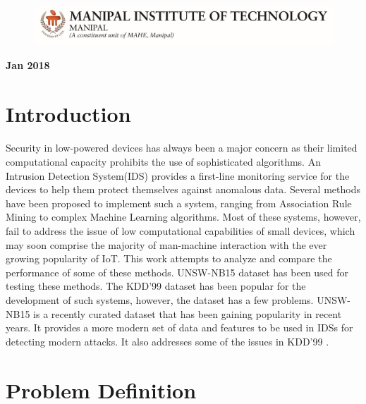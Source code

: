 \documentclass[a4paper,12pt]{article}
\begin{document}
\begin{titlepage}
		\begin{figure}[h]
	  	\begin{center}
		\includegraphics{MITLogo}
		\end{center}
		\end{figure}
		\begin{center}
		\textbf{Jan 2018}
		\end{center}

	\end{titlepage}


	\newpage

	\section{Introduction}
	\paragraph{}
	Security in low-powered devices has always been a major concern as their limited computational capacity prohibits the use of sophisticated algorithms. An Intrusion Detection System(IDS) provides a first-line monitoring service for the devices to help them protect themselves against anomalous data. Several methods have been proposed to implement such a system, ranging from Association Rule Mining to complex Machine Learning algorithms. Most of these systems, however, fail to address the issue of low computational capabilities of small devices, which may soon comprise the majority of man-machine interaction with the ever growing popularity of IoT. This work attempts to analyze and compare the performance of some of these methods. UNSW-NB15 dataset has been used for testing these methods. The KDD'99 dataset has been popular for the development of such systems, however, the dataset has a few problems. UNSW-NB15 is a recently curated dataset that has been gaining popularity in recent years. It provides a more modern set of data and features to be used in IDSs for detecting modern attacks. It also addresses some of the issues in KDD'99 \cite{unsw15}.

	\section{Problem Definition}
\end{document}
